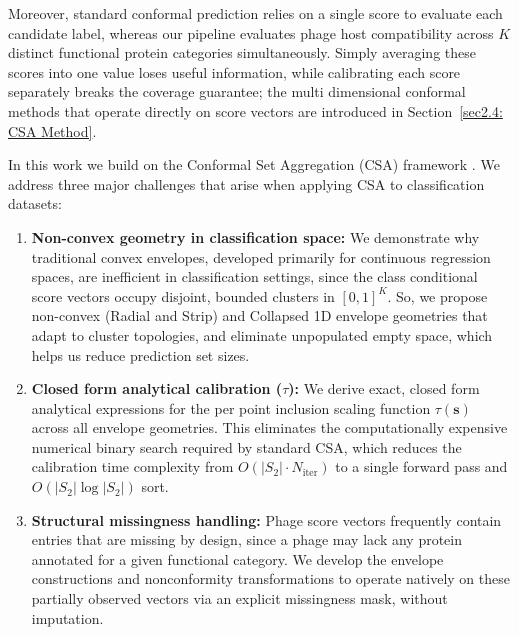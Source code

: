 Moreover, standard conformal prediction relies on a single score to evaluate each candidate label, whereas our pipeline evaluates 
phage host compatibility across $K$ distinct functional protein categories simultaneously. Simply averaging these scores into one 
value loses useful information, while calibrating each score separately breaks the coverage guarantee; the multi dimensional 
conformal methods that operate directly on score vectors are introduced in Section~\ref{sec2.4: CSA Method}.

In this work we build on the Conformal Set Aggregation (CSA) framework \cite{ochoarivera2024conformal}. We address 
three major challenges that arise when applying CSA to classification datasets:

\begin{enumerate}[label=(\roman*)]
    \item \textbf{Non-convex geometry in classification space:} We demonstrate why traditional convex envelopes, developed 
           primarily for continuous regression spaces, are inefficient in classification settings, since the class conditional score 
           vectors occupy disjoint, bounded clusters in $[0,1]^K$. So, we propose non-convex (Radial and Strip) and Collapsed 1D 
           envelope geometries that adapt to cluster topologies, and eliminate unpopulated empty space, which helps us reduce 
           prediction set sizes.
    
    \item \textbf{Closed form analytical calibration ($\tau$):} We derive exact, closed form analytical expressions for the 
           per point inclusion scaling function $\tau(\mathbf{s})$ across all envelope geometries. This eliminates the 
           computationally expensive numerical binary search required by standard CSA, which reduces the calibration time 
           complexity from $O(|S_2| \cdot N_{\text{iter}})$ to a single forward pass and $O(|S_2| \log |S_2|)$ sort.
    
    
    \item  \textbf{Structural missingness handling:} Phage score vectors frequently contain entries that are missing 
            by design, since a phage may lack any protein annotated for a given functional category. We develop the 
            envelope constructions and nonconformity transformations to operate natively on these partially observed 
            vectors via an explicit missingness mask, without imputation. 
\end{enumerate}

